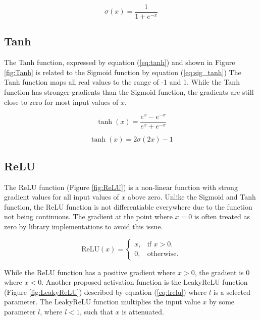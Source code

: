 \begin{equation}\label{eq:sigmoid}
    \sigma(x) = \frac{1}{1 + e^{-x}}
\end{equation}

\subsection{Tanh}
The Tanh function, expressed by equation (\ref{eq:tanh}) and shown in Figure \ref{fig:Tanh} is related to the Sigmoid function by equation (\ref{eq:sig_tanh})
The Tanh function maps all real values to the range of -1 and 1.
While the Tanh function has stronger gradients than the Sigmoid function, the gradients are still close to zero for most input values of $x$.

\begin{equation}\label{eq:tanh}
    \tanh(x) = \frac{e^x - e^{-x}}{e^x + e^{-x}}
\end{equation}

\begin{equation}\label{eq:sig_tanh}
    \tanh(x) = 2\sigma(2x) - 1
\end{equation}

\subsection{ReLU}
The ReLU function (Figure \ref{fig:ReLU}) is a non-linear function with strong gradient values for all input values of $x$ above zero.
Unlike the Sigmoid and Tanh function, the ReLU function is not differentiable everywhere due to the function not being continuous.
The gradient at the point where $x = 0$ is often treated as zero by library implementations to avoid this issue.

\begin{equation}\label{eq:relu}
    \text{ReLU}(x)=\begin{cases}
      x, & \text{if $x>0$}.\\
      0, & \text{otherwise}.
    \end{cases}
\end{equation}

While the ReLU function has a positive gradient where $x > 0$, the gradient is 0 where $x < 0$.
Another proposed activation function is the LeakyReLU function (Figure \ref{fig:LeakyReLU}) described by equation (\ref{eq:lrelu}) where $l$ is a selected parameter.
The LeakyReLU function multiplies the input value $x$ by some parameter $l$, where $l < 1$, such that $x$ is attenuated.

